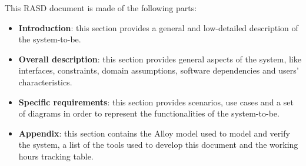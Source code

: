 \renewcommand{\arraystretch}{1.6}
\begin{center}
    
\end{center}
This RASD document is made of the following parts:
\begin{itemize}
    \item \textbf{Introduction}: this section provides a general and low-detailed description of the system-to-be.
    \item \textbf{Overall description}: this section provides general aspects of the system, like interfaces, constraints, domain assumptions, software dependencies and users' characteristics.
    \item \textbf{Specific requirements}: this section provides scenarios, use cases and a set of diagrams in order to represent the functionalities of the system-to-be.
    \item \textbf{Appendix}: this section contains the Alloy model used to model and verify the system, a list of the tools used to develop this document and the working hours tracking table.
\end{itemize}